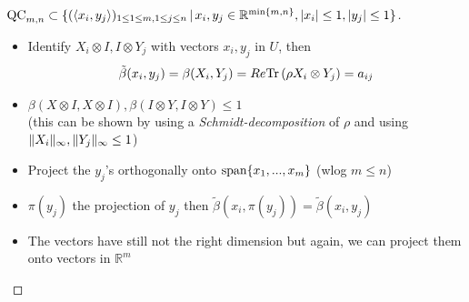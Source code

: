 \begin{frame}
	\begin{proof}[$ \textup{QC}_{m,n} \subset \{ (\langle x_i,y_j \rangle)_{1 \le 1 \le m, 1 \le j \le n} \,| \, x_i,y_j \in \mathbb{R}^{ \min \{m,n \} }, \vert x_i  \vert \le 1, \vert y_j \vert \le 1  \} $]
		\begin{itemize}
			\item<1-> {\footnotesize Identify $ X_i \otimes I,I \otimes Y_j $ with vectors $ x_i,y_j $ in $ U $, then 
			\begin{align*}
			\tilde{\beta}(x_i,y_j) = \beta(X_i,Y_j) = Re \text{Tr} \, {(\rho X_i \otimes Y_j)}  = a_{ij}
			\end{align*}}
			\item<2-> $ \beta (X \otimes I, X \otimes I), \beta (I \otimes Y, I \otimes Y) \le 1$ \\
			(this can be shown by using a {\itshape Schmidt-decomposition} of $ \rho $ and using $  \Vert {X_i} \Vert_{\infty},  \Vert {Y_j} \Vert_{\infty} \le 1 $)
			\item<3-> Project the $ y_j $'s orthogonally onto $ \textup{span} \{ x_1,...,x_m \} $  (wlog $ m \le n $)
			\item<4-> $ \pi(y_j) $ the projection of $ y_j $ then $ \tilde{\beta}(x_i,\pi(y_j)) = \tilde{\beta}(x_i,y_j) $
			\item<5-> The vectors have still not the right dimension but again, we can project them onto vectors in $ \mathbb{R}^m $
		\end{itemize}
		
	\end{proof}
\end{frame}


